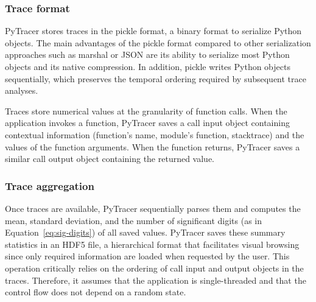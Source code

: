 \documentclass[11pt]{article}
\newcommand{\gkmod}[2]{\color{purple}\sout{#1} #2\color{black}\xspace}
\newcommand{\Yohan}[1]{\color{green!75!black}\textbf{Yohan:} #1\color{black}\xspace}
\newcommand{\pytracer}[0]{PyTracer\xspace}
\begin{document}

\subsubsection{Trace format}

\pytracer stores traces in the pickle format, a binary format to serialize Python objects.
The main advantages of the pickle format compared to other serialization approaches such as marshal or JSON are its ability to serialize most Python objects and its native compression.  In addition, pickle writes Python objects sequentially, which preserves the temporal ordering required by subsequent trace analyses.

Traces store numerical values at the granularity of function calls. When the application invokes a function, \pytracer saves a call input object containing contextual information (function's name, module's function, stacktrace) and the values of the function arguments. When the function returns, \pytracer saves a similar call output object containing the returned value. 


\subsubsection{Trace aggregation}

Once traces are available, \pytracer sequentially parses them and computes the mean, standard deviation, and the number of significant digits (as in Equation~\ref{eq:sig-digits}) of all saved values. \pytracer saves these summary statistics in an HDF5 file, a hierarchical format that facilitates visual browsing since only
required information are loaded when requested by the user.
This operation critically relies on the ordering of call input and output objects in the traces. Therefore, it assumes that the application is single-threaded and that the control flow does not depend on a random state. 
\end{document}
